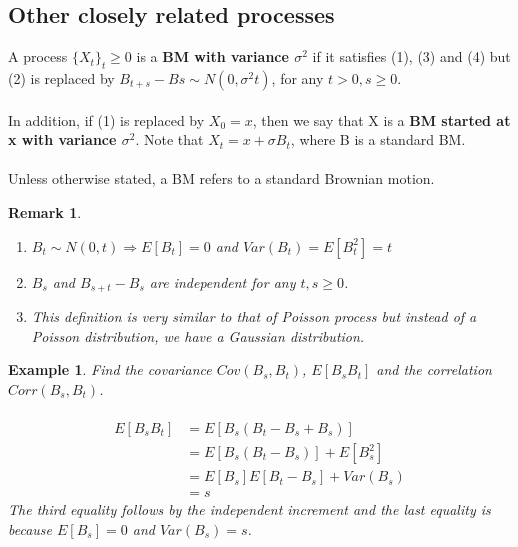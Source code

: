 \documentclass[12pt]{article}
\newtheorem*{remark}{Remark}
\newtheorem{example}{Example}
\begin{document}
\subsection{Other closely related processes}

A process $\{X_t\}_t\geq0$ is a \textbf{BM with variance $\sigma ^2$} if it satisfies (1), (3) and (4) but (2) is replaced by $B_{t+s}-B{s} \sim N(0,\sigma ^2t)$, for any $t > 0, s \geq 0$.
\\
\\In addition, if (1) is replaced by $X_0 = x$, then we say that X is a \textbf{BM started at x with variance $\sigma^2$}. Note that $X_t = x + \sigma B_t$, where B is a standard BM.
\\
\\Unless otherwise stated, a BM refers to a standard Brownian motion.

\begin{remark}
    \begin{enumerate}
        \item $B_t \sim N(0,t) \Rightarrow E[B_t] = 0$ and $Var(B_t) = E[B_t^2] = t$
        \item $B_s$ and $B_{s+t} - B_{s}$ are independent for any $t, s \geq 0$.
        \item This definition is very similar to that of Poisson process but instead of a Poisson distribution, we have a Gaussian distribution.
    \end{enumerate}
\end{remark}

\begin{example}
    Find the covariance $Cov(B_s, B_t)$, $E[B_sB_t]$ and the correlation $Corr(B_s,B_t)$.
    \\
    \\
    \begin{equation*}
        \begin{split}
            E[B_sB_t] & = E[B_s(B_t-B_s+B_s)] \\
            & = E[B_s(B_t - B_s)] + E[B_s^2] \\
            & = E[B_s]E[B_t - B_s] + Var(B_s) \\
            & = s
        \end{split}
    \end{equation*}
    The third equality follows by the independent increment and the last equality is because $E[B_s] = 0$ and $Var(B_s) = s$.
    
\end{example}
\end{document}
